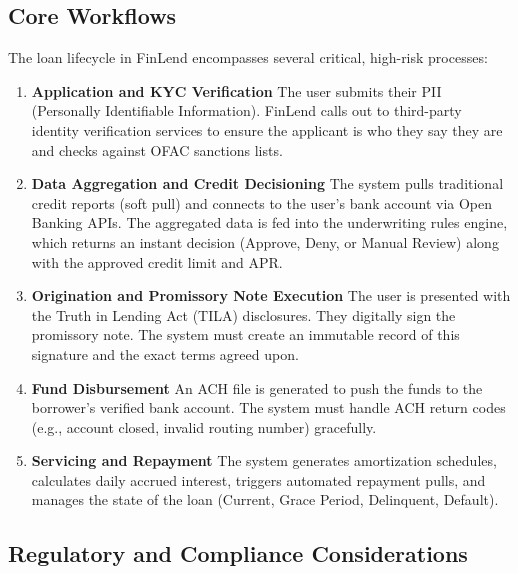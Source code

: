 \documentclass[
  11pt,
  openany,
  oneside]{book}
\begin{document}
\subsection{Core Workflows}\label{core-workflows-1}

The loan lifecycle in FinLend encompasses several critical, high-risk
processes:

\begin{enumerate}
\def\labelenumi{\arabic{enumi}.}
\item
  \textbf{Application and KYC Verification} The user submits their PII
  (Personally Identifiable Information). FinLend calls out to
  third-party identity verification services to ensure the applicant is
  who they say they are and checks against OFAC sanctions lists.
\item
  \textbf{Data Aggregation and Credit Decisioning} The system pulls
  traditional credit reports (soft pull) and connects to the user's bank
  account via Open Banking APIs. The aggregated data is fed into the
  underwriting rules engine, which returns an instant decision (Approve,
  Deny, or Manual Review) along with the approved credit limit and APR.
\item
  \textbf{Origination and Promissory Note Execution} The user is
  presented with the Truth in Lending Act (TILA) disclosures. They
  digitally sign the promissory note. The system must create an
  immutable record of this signature and the exact terms agreed upon.
\item
  \textbf{Fund Disbursement} An ACH file is generated to push the funds
  to the borrower's verified bank account. The system must handle ACH
  return codes (e.g., account closed, invalid routing number)
  gracefully.
\item
  \textbf{Servicing and Repayment} The system generates amortization
  schedules, calculates daily accrued interest, triggers automated
  repayment pulls, and manages the state of the loan (Current, Grace
  Period, Delinquent, Default).
\end{enumerate}

\subsection{Regulatory and Compliance
Considerations}\label{regulatory-and-compliance-considerations-1}
\end{document}
